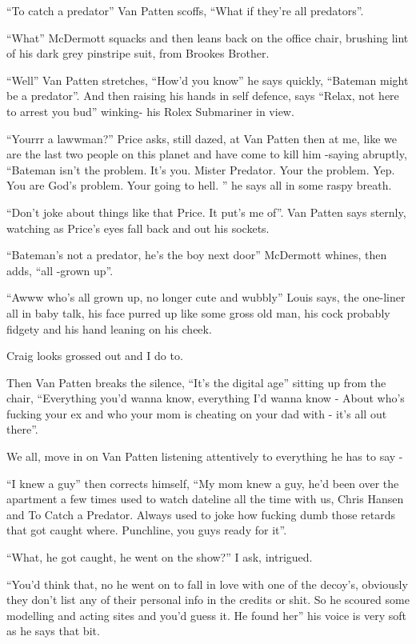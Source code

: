 \documentclass[19pt,openany]{book}
\begin{document}
``To catch a predator'' Van Patten scoffs,
``What if they're all predators''.

``What'' McDermott squacks and then leans back
on the office chair,
brushing lint of his dark grey pinstripe suit, from Brookes Brother.

``Well'' Van Patten stretches, ``How'd you know'' he says quickly, ``Bateman
might be a predator''.
And then raising his hands in self defence, says ``Relax,
not here to arrest you bud'' winking- his Rolex Submariner in view.

``Yourrr a lawwman?'' Price asks, still dazed, at Van Patten then
at me, like we are the last two people on this planet
and have come to kill him -saying
abruptly, ``Bateman isn't the problem.
It's you. Mister Predator. Your the problem.
Yep. You are God's problem. Your going to hell.
''
he says all in some raspy breath.

``Don't joke about things like that Price. It put's me of''.
Van Patten says sternly, watching as Price's eyes
fall back and out his sockets.

``Bateman's not a predator, he's the boy next door''
McDermott whines, then adds, ``all -grown up''.

``Awww who's all grown up, no longer cute and wubbly'' Louis
says, the one-liner all in baby talk, his
face purred up like some gross old man, his cock probably
fidgety and his hand leaning on his cheek.

Craig looks grossed out and I do to.

Then Van Patten breaks the silence,
``It's the digital age''
sitting up from the chair,
``Everything you'd wanna know,
everything I'd wanna know -
About who's fucking your ex and who
your mom is cheating on your dad with -
it's all out there''.

We all, move in on Van Patten listening
attentively to everything he has to say -

``I knew a guy'' then corrects himself, ``My
mom knew a guy, he'd been over the apartment
a few times used to watch dateline all the
time with us, Chris Hansen and To Catch a Predator.
Always used to joke how fucking dumb
those retards that got caught where. Punchline,
you guys ready for it''.

``What, he got caught, he went on the show?'' I ask,
intrigued.

``You'd think that, no he went on to fall
in love with one of the decoy's, obviously
they don't list any of their personal info
in the credits or shit. So he scoured some
modelling and acting sites and you'd guess it.
He found her'' his voice is very soft as
he says that bit.
\end{document}
